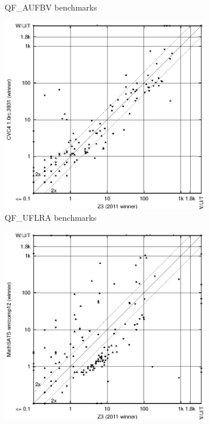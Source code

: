\documentclass[twosize,11pt]{article}
\begin{document}
\begin{figure}[ht]
\begin{subfigure}{0.45\textwidth}
	   \caption{QF\_AUFBV benchmarks}
	\end{subfigure}
\begin{subfigure}{0.45\textwidth}
	   \includegraphics[width=1\textwidth]{QF_UFLRA-scatter-improvement.eps}
	   \caption{QF\_UFLRA benchmarks}
	\end{subfigure}
\begin{subfigure}{0.45\textwidth}
	   \includegraphics[width=1\textwidth]{QF_UFLIA-scatter-improvement.eps}

\end{subfigure}
\end{figure}
\end{document}
